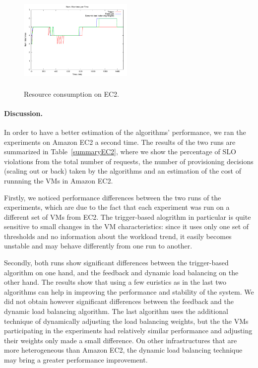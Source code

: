 \begin{figure}
\begin{center}
\includegraphics[width=0.49\textwidth, height=5cm]{./images/heterogeneous/numMachinesCompEC2}
\end{center}
\vspace{-5mm}
\caption{Resource consumption on EC2.}
\label{resEC2}
\end{figure}


\paragraph{Discussion.}
In order to have a better estimation of the algorithms' performance, we 
ran the experiments on Amazon EC2 a second time. The results of the two 
runs are summarized in Table~\ref{summaryEC2}, where we show the percentage
of SLO violations from the total number of requests, the number of
provisioning decisions (scaling out or back) taken by the algorithms
and an estimation of the cost of runnning the VMs in Amazon EC2.

Firstly, we noticed performance differences between the two runs of the
experiments, which are due to the fact that each experiment was run on
a different set of VMs from EC2. The trigger-based alogrithm in particular
is quite sensitive to small changes in the VM characteristics: since it
uses only one set of thresholds and no information about the workload
trend, it easily becomes unstable and may behave differently from one
run to another.

Secondly, both runs show significant differences between the trigger-based
algorithm on one hand, and the feedback and dynamic load balancing on
the other hand. The results show that using a few euristics as in the last
two algorithms can help in improving the performance and stability
of the system. We did not obtain however significant differences
between the feedback and the dynamic load balancing algorithm. The last
algorithm uses the additional technique of dynamically adjusting the
load balancing weights, but the the VMs participating in the experiments 
had relatively similar performance and adjusting their weights only
made a small difference. On other infrastructures that are more heterogeneous
than Amazon EC2, the dynamic load balancing technique may bring
a greater performance improvement.  

